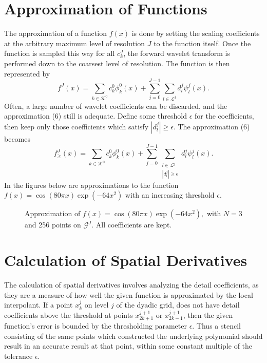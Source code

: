 \documentclass[11pt]{article}
\begin{document}
\section{Approximation of Functions}
The approximation of a function $f(x)$ is done by setting the scaling coefficients at the arbitrary maximum level of 
resolution $J$ to the function itself. Once the function is sampled this way for all $c_{k}^{J}$, the forward wavelet transform is 
performed down to the coarsest level of resolution. The function is then represented by 
\begin{equation}
        f^J(x)=\sum_{k \in \mathcal{K}^0} c_{k}^{0} \phi_{k}^{0}(x) + \sum_{j=0}^{J-1} \sum_{l \in \mathcal{L}^j}
                d_{l}^{j} \psi_{l}^{j}(x).
\end{equation}
Often, a large number of wavelet coefficients can be discarded, and the approximation (6) still is adequate. Define some threshold $\epsilon$ for the coefficients, then keep only those coefficients which satisfy $|d_{l}^{j}| \geq \epsilon$. The approximation (6) becomes 
\begin{equation}
        f_{\geq}^{J}(x)=\sum_{k \in \mathcal{K}^0} c_{k}^{0} \phi_{k}^{0}(x) + \sum_{j=0}^{J-1} \sum_{ \substack{ l \in \mathcal{L}^j \\ |d_{l}^{j}| \geq \epsilon} } d_{l}^{j} \psi_{l}^{j}(x).
\end{equation}
In the figures below are approximations to the function $f(x)=\cos{(80 \pi x)} \exp{(-64 x^2)}$ with an increasing threshold 
$\epsilon$.
\begin{figure}[H]
	\center
	
	\caption{Approximation of $f(x)=\cos{(80 \pi x)} \exp{(-64 x^2)},$ with $N=3$ and 256 points on $\mathcal{G}^J$. All coefficients are kept.}
\end{figure}


\section{Calculation of Spatial Derivatives}
The calculation of spatial derivatives involves analyzing the detail coefficients, as they are a measure of how well the 
given function is approximated by the local interpolant. If a point $x_{k}^{j}$ on level $j$ of the dyadic grid, does not have 
detail coefficients above the threshold at points $x_{2k+1}^{j+1}$ or $x_{2k-1}^{j+1}$, then the given function's error is
bounded by the thresholding parameter $\epsilon$.  Thus a stencil consisting of the same points
which constructed the underlying polynomial should result in an accurate result at that point, 
within some constant multiple of the tolerance $\epsilon$.
\end{document}

